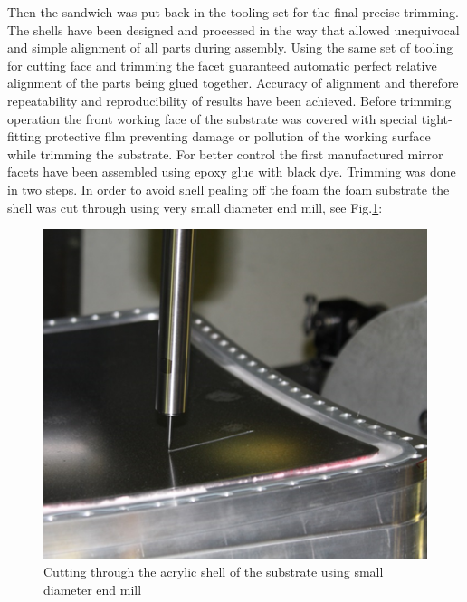 Then the sandwich was put back in the tooling set for the final precise trimming. The shells have been designed and processed in the way that allowed  unequivocal and simple alignment of all parts during assembly. Using the same set of tooling for cutting face and trimming the facet guaranteed automatic perfect relative alignment of the parts being glued together. Accuracy of alignment and therefore repeatability and reproducibility of results have been achieved. Before trimming operation the front working face of the substrate was covered with special tight-fitting protective film preventing damage or pollution of the working surface while trimming the substrate. For better control the first manufactured mirror facets have been assembled using epoxy glue with black dye. Trimming was done in two steps. In order to avoid shell pealing off the foam the foam substrate the shell was cut through using very small diameter end mill, see Fig.\ref{fig:Trimming_1}:
\begin{figure}[h]
    \centering
    \includegraphics[width=1.0\linewidth]{Trimming_1}
    \caption{Cutting through the acrylic shell of the substrate using small diameter end mill}
    \label{fig:Trimming_1}
\end{figure}{}

